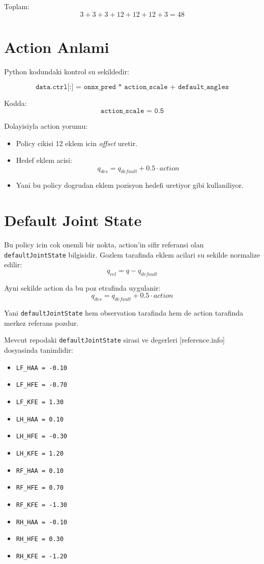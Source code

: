 \documentclass[11pt,a4paper]{article}
\begin{document}
  Toplam:
  \[
  3 + 3 + 3 + 12 + 12 + 12 + 3 = 48
  \]

\section*{Action Anlami}
Python kodundaki kontrol su sekildedir:

  \[
  \texttt{data.ctrl[:] = onnx\_pred * action\_scale + default\_angles}
  \]

  Kodda:
  \[
  \texttt{action\_scale = 0.5}
  \]

  Dolayisiyla action yorumu:

  \begin{itemize}
\item Policy cikisi 12 eklem icin \emph{offset} uretir.
\item Hedef eklem acisi:
\[
q_{des} = q_{default} + 0.5 \cdot action
\]
\item Yani bu policy dogrudan eklem pozisyon hedefi uretiyor gibi kullaniliyor.
\end{itemize}

\section*{Default Joint State}
Bu policy icin cok onemli bir nokta, action'in sifir referansi olan \texttt{defaultJointState} bilgisidir. Gozlem tarafinda eklem acilari su sekilde normalize edilir:
\[
q_{rel} = q - q_{default}
\]

Ayni sekilde action da bu poz etrafinda uygulanir:
\[
q_{des} = q_{default} + 0.5 \cdot action
\]

Yani \texttt{defaultJointState} hem observation tarafinda hem de action tarafinda merkez referans pozdur.

Mevcut repodaki \texttt{defaultJointState} sirasi ve degerleri [reference.info] dosyasinda tanimlidir:

\begin{itemize}
\item \texttt{LF\_HAA = -0.10}
\item \texttt{LF\_HFE = -0.70}
\item \texttt{LF\_KFE = 1.30}
\item \texttt{LH\_HAA = 0.10}
\item \texttt{LH\_HFE = -0.30}
\item \texttt{LH\_KFE = 1.20}
\item \texttt{RF\_HAA = 0.10}
\item \texttt{RF\_HFE = 0.70}
\item \texttt{RF\_KFE = -1.30}
\item \texttt{RH\_HAA = -0.10}
\item \texttt{RH\_HFE = 0.30}
\item \texttt{RH\_KFE = -1.20}
\end{itemize}
\end{document}
